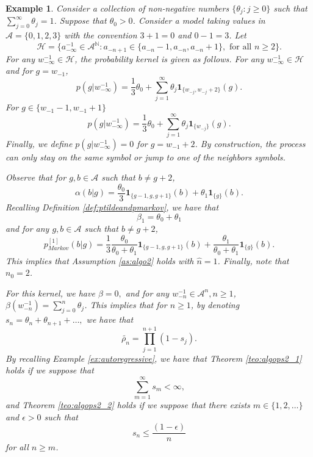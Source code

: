 \documentclass[a4paper]{article}
\newtheorem{example}[theorem]{Example}
\newcommand{\N}{\mathbb{N}}
\renewcommand{\H}{\mathcal{H}}
\newcommand{\A}{\mathcal{A}}
\begin{document}

\begin{example} \label{ex:algo2}
Consider a collection of non-negative numbers $\{\theta_j:j\geq 0\}$  such that $\sum_{j=0}^{\infty}\theta_j=1$. Suppose that $\theta_0>0$. Consider a model taking values in $\A=\{0,1,2,3\}$ with the convention $3+1=0$ and $0-1=3$. Let 
$$
\H=\{a_{-\infty}^{-1}\in \A^{\N}:a_{-n+1}\in \{a_{-n}-1,a_{-n},a_{-n}+1\}, \text{ for all } n \geq 2\}.
$$
For any $w_{-\infty}^{-1}\in \H$, the probability kernel is given as follows. For any $w_{-\infty}^{-1}\in \H$ and for $g=w_{-1}$,
$$
p(g|w_{-\infty}^{-1})= \frac{1}{3}\theta_0 +\sum_{j=1}^{\infty}\theta_j
\mathbf{1}_{\{w_{-j}, w_{-j}+2 \}}(g).
$$
For $g\in \{w_{-1}-1,w_{-1}+1\}$
$$
p(g|w_{-\infty}^{-1})= \frac{1}{3}\theta_0%
+\sum_{j=1}^{\infty}\theta_j\mathbf{1}_{\{w_{-j}\}}(g).
$$
Finally, we define $p(g|w_{-\infty}^{-1})=0$ for $g=w_{-1}+2$.
By construction, the process can only stay on the same symbol or jump to one of the neighbors symbols. %

Observe that for $g,b\in \A$ such that $b\neq g+2$,
$$
\alpha(b|g)=\frac{\theta_0}{3}\mathbf{1}_{\{g-1,g,g+1\}}(b)+\theta_1\mathbf{1}_{\{g\}}(b).
$$
Recalling Definition \ref{def:ptildeandpmarkov}, we have that
$$
\beta_1=\theta_0+\theta_1
$$
and for any $g,b\in \A$ such that $b\neq g+2$,
$$
p_{Markov}^{[1]}(b|g)=\frac{1}{3}\frac{\theta_0}{\theta_0+\theta_1}\mathbf{1}_{\{g-1,g,g+1\}}(b)+\frac{\theta_1}{\theta_0+\theta_1}\mathbf{1}_{\{g\}}(b).
$$
This implies that Assumption \ref{as:algo2} holds with $\hat n=1$. Finally, note that $n_0=2$.

For this kernel, we have $\beta=0,$ and for any $w_{-n}^{-1} \in \A^n, n\geq 1$, $\beta(w_{-n}^{-1})=\sum_{j=0}^{n}\theta_j$. This implies that for $n\geq 1$, by denoting $s_n=\theta_{n}+\theta_{n+1}+\ldots,$ we have that
$$
\tilde{\rho_n}= \prod_{j=1}^{n+1}(1-s_{j}).
$$
By recalling Example \ref{ex:autoregressive}, we have that Theorem \ref{teo:algops2_1} holds if we suppose that
$$
\sum_{m=1}^{\infty}s_m< \infty ,
$$ 
and Theorem \ref{teo:algops2_2} holds if we suppose that there exists $m\in \{1,2,\ldots\}$ and $\epsilon >0$ such that
$$
s_n\leq \frac{(1-\epsilon)}{n}
$$
for all $n\geq m$.
\end{example}
\end{document}

